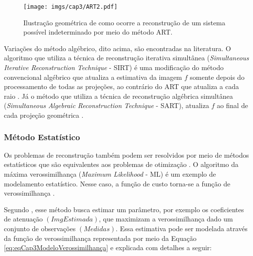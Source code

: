 {{\begin{figure}[h]
	\caption{Ilustração geométrica de como ocorre a reconstrução de um sistema possível indeterminado por meio do método \acs{ART}.}
	\begin{center}
		\texttt{[image: imgs/cap3/ART2.pdf]}
	\end{center}
	\label{fig:imgCap3ARTIndeterminado}
\end{figure}

Variações do método algébrico, dito acima, são encontradas na literatura. O algoritmo que utiliza a técnica de reconstrução iterativa simultânea (\textit{Simultaneous Iterative Reconstruction Technique} - \acs{SIRT}) é uma modificação do método convencional algébrico que atualiza a estimativa da imagem $f$ somente depois do processamento de todas as projeções, ao contrário do \acs{ART} que atualiza a cada raio \cite{zhang2006comparative,yang2012numerical,zeng2010medical}. Já o método que utiliza a técnica de reconstrução algébrica simultânea (\textit{Simultaneous Algebraic Reconstruction Technique} - \acs{SART}), atualiza $f$ ao final de cada projeção geométrica \cite{zhang2006comparative,levakhina2014three,yang2012numerical}.   


\subsubsection{Método Estatístico}\label{MétodoEstatístico}

Os problemas de reconstrução também podem ser resolvidos por meio de métodos estatísticos que são equivalentes aos problemas de otimização \cite[p. 79]{levakhina2014three}. O algoritmo da máxima verossimilhança (\textit{Maximum Likelihood} - \acs{ML}) é um exemplo de modelamento estatístico. Nesse caso, a função de custo torna-se a função de verossimilhança \cite[p. 77]{levakhina2014three}.

Segundo , esse método busca estimar um parâmetro, por exemplo os coeficientes de atenuação $(ImgEstimada)$, que maximizam a verossimilhança dado um conjunto de observações $(Medidas)$. Essa estimativa pode ser modelada através da função de verossimilhança representada por meio da Equação \ref{eq:eqCap3ModeloVerossimilhança} e explicada com detalhes a seguir:

}}
